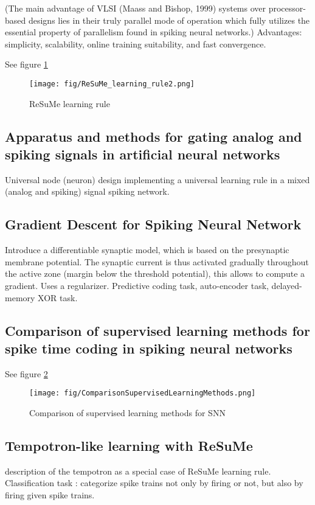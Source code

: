\documentclass[12pt]{article}
\begin{document}
(The main advantage of VLSI (Maass and Bishop, 1999) systems over processor-based designs lies in their truly parallel mode of operation which fully utilizes the essential property of parallelism found in spiking neural networks.) Advantages: simplicity, scalability, online training suitability, and fast convergence.

See figure \ref{ReSuMe2}
\begin{figure}
\center
\texttt{[image: fig/ReSuMe\_learning\_rule2.png]}
\caption{ReSuMe learning rule}
\label{ReSuMe2}
\end{figure}

\subsection{Apparatus and methods for gating analog and spiking signals in artificial neural networks \cite{ponulak2015apparatus}}

Universal node (neuron) design implementing a universal learning rule in a mixed (analog and spiking) signal spiking network.

\subsection{Gradient Descent for Spiking Neural Network \cite{huh2018gradient}}
Introduce a differentiable synaptic model, which is based on the presynaptic membrane potential. The synaptic current is thus activated gradually throughout the active zone (margin below the threshold potential), this allows to compute a gradient. Uses a regularizer.
Predictive coding task, auto-encoder task, delayed-memory XOR task.

\subsection{Comparison of supervised learning methods for spike time coding in spiking neural networks \cite{kasinski2006comparison}}
See figure \ref{comparisonSupLearn}
\begin{figure}
\center
\texttt{[image: fig/ComparisonSupervisedLearningMethods.png]}
\caption{Comparison of supervised learning methods for SNN}
\label{comparisonSupLearn}
\end{figure}

\subsection{Tempotron-like learning with ReSuMe \cite{florian2008tempotron}}
description of the tempotron as a special case of ReSuMe learning rule. Classification task : categorize spike trains not only by firing or not, but also by firing given spike trains.
\end{document}
